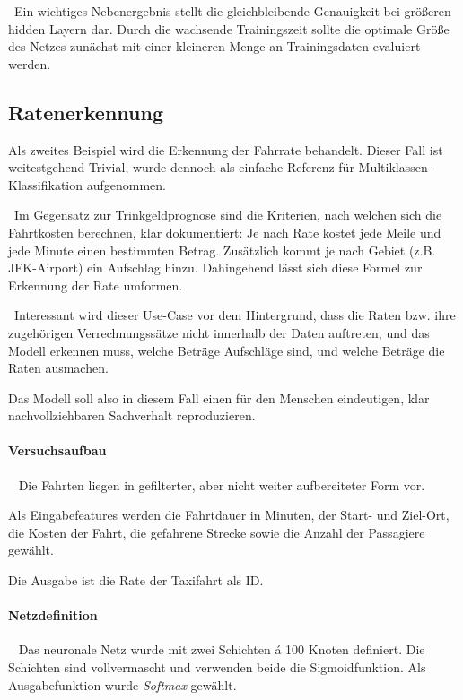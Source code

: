 ~\newline Ein wichtiges Nebenergebnis stellt die gleichbleibende Genauigkeit bei größeren hidden Layern dar. Durch die wachsende Trainingszeit sollte die optimale Größe des Netzes zunächst mit einer kleineren Menge an Trainingsdaten evaluiert werden.  
\newpage
\subsection{Ratenerkennung}
\label{sec:RatePred}
Als zweites Beispiel wird die Erkennung der Fahrrate behandelt. Dieser Fall ist weitestgehend Trivial, wurde dennoch als einfache Referenz für Multiklassen-Klassifikation aufgenommen. 

~\newline Im Gegensatz zur Trinkgeldprognose sind die Kriterien, nach welchen sich die Fahrtkosten berechnen, klar dokumentiert: Je nach Rate kostet jede Meile und jede Minute einen bestimmten Betrag. Zusätzlich kommt je nach Gebiet (z.B. JFK-Airport) ein Aufschlag hinzu. Dahingehend lässt sich diese Formel zur Erkennung der Rate umformen.

~\newline Interessant wird dieser Use-Case vor dem Hintergrund, dass die Raten bzw. ihre zugehörigen Verrechnungssätze nicht innerhalb der Daten auftreten, und das Modell erkennen muss, welche Beträge Aufschläge sind, und welche Beträge die Raten ausmachen. 

Das Modell soll also in diesem Fall einen für den Menschen eindeutigen, klar nachvollziehbaren Sachverhalt reproduzieren. 
\paragraph{Versuchsaufbau} ~\newline
Die Fahrten liegen in gefilterter, aber nicht weiter aufbereiteter Form vor. 

Als Eingabefeatures werden die Fahrtdauer in Minuten, der Start- und Ziel-Ort, die Kosten der Fahrt, die gefahrene Strecke sowie die Anzahl der Passagiere gewählt. 

Die Ausgabe ist die Rate der Taxifahrt als ID.
\paragraph{Netzdefinition} ~\newline
Das neuronale Netz wurde mit zwei Schichten á 100 Knoten definiert. Die Schichten sind vollvermascht und verwenden beide die Sigmoidfunktion. Als Ausgabefunktion wurde \textit{Softmax} gewählt.

